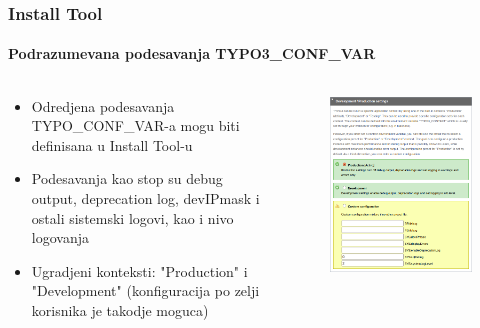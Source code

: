 \begin{frame}[fragile]
	\frametitle{Install Tool}
	\framesubtitle{Podrazumevana podesavanja TYPO3\_CONF\_VAR}

	\begin{columns}[T]
		\begin{column}{.5\textwidth}

			\begin{itemize}
				\item Odredjena podesavanja TYPO\_CONF\_VAR-a mogu biti definisana u Install Tool-u
				\item Podesavanja kao stop su debug output, deprecation log, devIPmask i ostali sistemski logovi, kao i nivo logovanja
				\item Ugradjeni konteksti: "Production" i "Development"\newline
					(konfiguracija po zelji korisnika je takodje moguca)
			\end{itemize}

		\end{column}
		\begin{column}{.5\textwidth}

			\begin{figure}\vspace*{-0.4cm}
				\includegraphics[width=0.8\linewidth]{Images/InstallTool/ApplicationContext.png}
			\end{figure}

		\end{column}
	\end{columns}

\end{frame}

